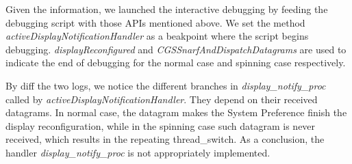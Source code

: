 Given the information, we launched the interactive debugging by 
feeding the debugging script with those APIs mentioned above. We set the method
\textit{activeDisplayNotificationHandler} as a beakpoint where the script begins
debugging. \textit{displayReconfigured} and \textit{CGSSnarfAndDispatchDatagrams}
are used to indicate the end of debugging for the normal case and spinning case
respectively.

By diff the two logs, we notice the different branches in
\textit{display\_notify\_proc} called by \textit{activeDisplayNotificationHandler}. 
They depend on their received datagrams. In normal case, the datagram makes the
System Preference finish the display reconfiguration, while in the spinning case
such datagram is never received, which results in the repeating thread\_switch.
As a conclusion, the handler \textit{display\_notify\_proc} is not appropriately
implemented.
